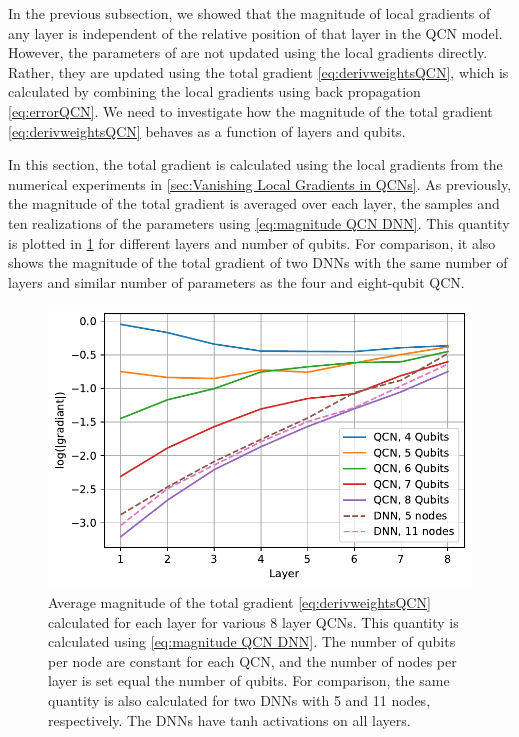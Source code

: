 
In the previous subsection, we showed that the magnitude of local gradients of any layer is independent of the relative position of that layer in the QCN model. However, the parameters of are not updated using the local gradients directly. Rather, they are updated using the total gradient \cref{eq:derivweightsQCN}, which is calculated by combining the local gradients using back propagation \cref{eq:errorQCN}. We need to investigate how the magnitude of the total gradient \cref{eq:derivweightsQCN} behaves as a function of layers and qubits. 

In this section, the total gradient is calculated using the local gradients from the numerical experiments in \cref{sec:Vanishing Local Gradients in QCNs}. As previously, the magnitude of the total gradient is averaged over each layer, the samples and ten realizations of the parameters using \cref{eq:magnitude QCN DNN}. This quantity is plotted in \cref{fig:QNC_vanishing_total} for different layers and number of qubits. For comparison, it also shows the magnitude of the total gradient of two DNNs with the same number of layers and similar number of parameters as the four and eight-qubit QCN.

\begin{figure}[H]
    \centering
    \includegraphics[width=12cm]{latex/figures/vanishing_gradient_total.pdf}
    \caption{Average magnitude of the total gradient \cref{eq:derivweightsQCN} calculated for each layer for various 8 layer QCNs. This quantity is calculated using \cref{eq:magnitude QCN DNN}. The number of qubits per node are constant for each QCN, and the number of nodes per layer is set equal the number of qubits.  For comparison, the same quantity is also calculated for two DNNs with 5 and 11 nodes, respectively. The DNNs have tanh activations on all layers.}
    \label{fig:QNC_vanishing_total}
\end{figure}

